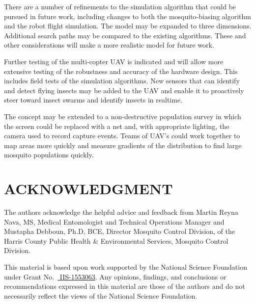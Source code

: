 \documentclass[letterpaper, 10 pt, conference]{ieeeconf}  %
\begin{document}
There are a number of refinements to the simulation algorithm that could be pursued in future work, including changes to both the mosquito-biasing algorithm and the robot flight simulation.  The model may be expanded to three dimensions.  Additional search paths may be compared to the existing algorithms.  These and other considerations will make a more realistic model for future work.  

Further testing of the multi-copter UAV is indicated and will allow more extensive testing of the robustness and accuracy of the hardware design.  This includes field tests of the simulation algorithms.  New sensors that can identify and detect flying insects \cite{chen2014flying} may be added to the UAV and enable it to proactively steer toward insect swarms and identify insects in realtime.

The concept may be extended to a non-destructive population survey in which the screen could be replaced with a net and, with appropriate lighting, the camera used to record capture events.  Teams of UAV's could work together to map areas more quickly and measure gradients of the distribution to find large mosquito populations quickly.



\section*{ACKNOWLEDGMENT}
The authors acknowledge the helpful advice and feedback from Martin Reyna Nava, MS, Medical Entomologist and Technical Operations Manager and Mustapha Debboun, Ph.D, BCE, Director Mosquito Control Division, of the Harris County Public Health \& Environmental Services, Mosquito Control Division.

This material is based upon work supported by the National Science Foundation under Grant No.\ 
\href{http://nsf.gov/awardsearch/showAward?AWD_ID=1553063}{ IIS-1553063}.
Any opinions, findings, and conclusions or recommendations expressed in this material are those of the authors and do not necessarily reflect the views of the National Science Foundation.


\end{document}
